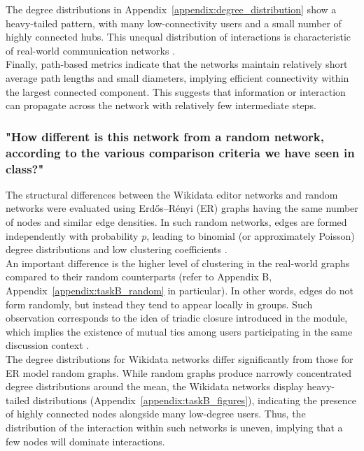 \documentclass[acmsmall,nonacm,natbib=false]{acmart}
\begin{document}
The degree distributions in Appendix~\ref{appendix:degree_distribution} show a heavy-tailed pattern, with many low-connectivity users and a small number of highly connected hubs. This unequal distribution of interactions is characteristic of real-world communication networks \cite{newman2010networks}.\\
Finally, path-based metrics indicate that the networks maintain relatively short average path lengths and small diameters, implying efficient connectivity within the largest connected component. This suggests that information or interaction can propagate across the network with relatively few intermediate steps.

\subsubsection{\large{\textbf{"How different is this network from a random network, according to the various comparison criteria we have seen in class?"}}}
\leavevmode \par \noindent
The structural differences between the Wikidata editor networks and random networks were evaluated using Erd\H{o}s--R\'enyi (ER)  graphs having the same number of nodes and similar edge densities. In such random networks, edges are formed independently with probability \(p\), leading to binomial (or approximately Poisson) degree distributions and low clustering coefficients \cite{easley2010networks,newman2010networks}.\\
An important difference is the higher level of clustering in the real-world graphs compared to their random counterparts (refer to Appendix B, Appendix~\ref{appendix:taskB_random} in particular). In other words, edges do not form randomly, but instead they tend to appear locally in groups. Such observation corresponds to the idea of triadic closure introduced in the module, which implies the existence of mutual ties among users participating in the same discussion context \cite{easley2010networks}.\\
The degree distributions for Wikidata networks differ significantly from those for ER model random graphs. While random graphs produce narrowly concentrated degree distributions around the mean, the Wikidata networks display heavy-tailed distributions (Appendix~\ref{appendix:taskB_figures}), indicating the presence of highly connected nodes alongside many low-degree users. Thus, the distribution of the interaction within such networks is uneven, implying that a few nodes will dominate interactions.\\
\end{document}
